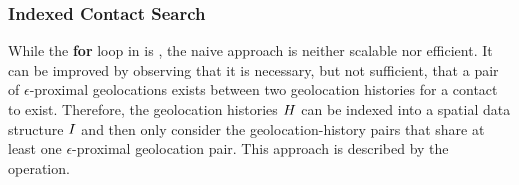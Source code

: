 
\subsubsection{Indexed Contact Search}
While the \textbf{for} loop in  is  \cite[p. 14]{Herlihy2012}, the naive approach is neither scalable nor efficient. It can be improved by observing that it is necessary, but not sufficient, that a pair of $\epsilon$-proximal geolocations exists between two geolocation histories for a contact to exist. Therefore, the geolocation histories $H$ can be indexed into a spatial data structure $I$ \cite{Mokbel2003, Dinh2010, Mahmood2019} and then only consider the geolocation-history pairs that share at least one $\epsilon$-proximal geolocation pair. This approach is described by the  operation.

